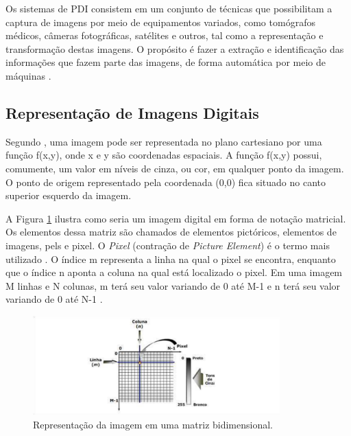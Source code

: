 Os sistemas de PDI consistem em um conjunto de técnicas que possibilitam a captura de imagens por meio de equipamentos variados, como tomógrafos médicos, câmeras fotográficas, satélites e outros, tal como a representação e transformação destas imagens. O propósito é fazer a extração e identificação das informações que fazem parte das imagens, de forma automática por meio de máquinas \cite{PEDRINI2008}.





\subsection{Representação de Imagens Digitais}


Segundo , uma imagem pode ser representada no plano cartesiano por uma função f(x,y), onde x e y são coordenadas espaciais. A função f(x,y) possui, comumente, um valor em níveis de cinza, ou cor, em qualquer ponto da imagem. O ponto de origem representado pela coordenada (0,0) fica situado no canto superior esquerdo da imagem.




A Figura \ref{img1} ilustra como seria um imagem digital em forma de notação matricial. Os elementos dessa matriz são chamados de elementos pictóricos, elementos de imagens, pels e pixel. O \textit{Pixel} (contração de \textit{Picture Element}) é o termo mais utilizado \cite{GONZALEZ2006}. O índice m representa a linha na qual o pixel se encontra, enquanto que o índice n aponta a coluna na qual está localizado o pixel. Em uma imagem M linhas e N colunas, m terá seu valor variando de 0 até M-1 e n terá seu valor variando de 0 até N-1 \cite{Almeida2018}. 

 \begin{figure}[h!]
	\centering
	\includegraphics[width=0.85\textwidth]{Imagens/imagem1} 
	\caption[Representação da imagem em uma matriz bidimensional.]{Representação da imagem em uma matriz bidimensional.}
	\label{img1}
\end{figure}

